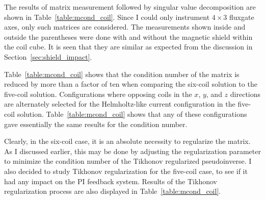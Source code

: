 The results of matrix measurement followed by singular value
decomposition are shown in Table~\ref{table:mcond_coil}.  Since I
could only instrument $4\times 3$ fluxgate axes, only such matrices
are considered.  The measurements shown inside and outside the parentheses were done with and without the magnetic shield within the coil cube. It is seen that they are similar as expected from the discussion in Section~\ref{sec:shield_impact}.

Table~\ref{table:mcond_coil} shows that the condition number of the
matrix is reduced by more than a factor of ten when comparing the
six-coil solution to the five-coil solution.  Configurations where
opposing coils in the $x$, $y$, and $z$ directions are alternately
selected for the Helmholtz-like current configuration in the five-coil
solution.  Table~\ref{table:mcond_coil} shows that any of these
configurations gave essentially the same results for the condition
number.

Clearly, in the six-coil case, it is an absolute necessity to
regularize the matrix.  As I discussed earlier, this may be done by
adjusting the regularization parameter to minimize the condition
number of the Tikhonov regularized pseudoinverse.  I also decided to
study Tikhonov regularization for the five-coil case, to see if it had
any impact on the PI feedback system.  Results of the Tikhonov
regularization process are also displayed in
Table~\ref{table:mcond_coil}.


